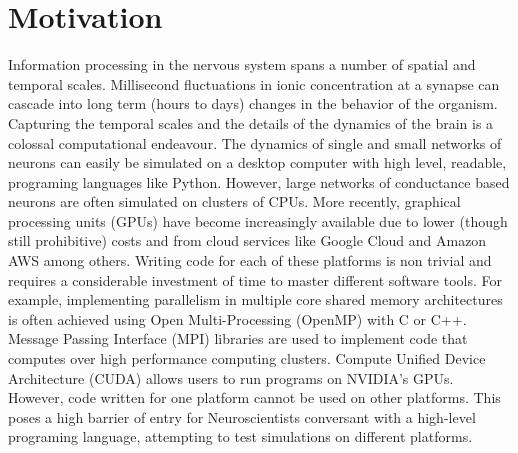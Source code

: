 \documentclass[10pt,letterpaper]{article}
\begin{document}



\section*{Motivation}
Information processing in the nervous system spans a number of spatial and temporal scales. Millisecond fluctuations in ionic concentration at a synapse can cascade into long term (hours to days) changes in the behavior of the organism. Capturing the temporal scales and the details of the dynamics of the brain is a colossal computational endeavour. The dynamics of single and small networks of neurons can easily be simulated on a desktop computer with high level, readable, programing languages like Python. However, large networks of conductance based neurons are often simulated on clusters of CPUs. More recently, graphical processing units (GPUs) have become increasingly available due to lower (though still prohibitive) costs and from cloud services like Google Cloud and Amazon AWS among others. Writing code for each of these platforms is non trivial and requires a considerable investment of time to master different software tools. For example, implementing parallelism in multiple core shared memory architectures is often achieved using Open Multi-Processing (OpenMP) with C or C++. Message Passing Interface (MPI) libraries are used to implement code that computes over high performance computing clusters. Compute Unified Device Architecture (CUDA) allows users to run programs on NVIDIA's GPUs. However, code written for one platform cannot be used on other platforms. This poses a high barrier of entry for Neuroscientists conversant with a high-level programing language, attempting to test simulations on different platforms. 
\end{document}
